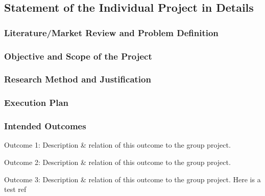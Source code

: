 \subsection{Statement of the Individual Project in Details}

\subsubsection{Literature/Market Review and Problem Definition}

\subsubsection{Objective and Scope of the Project}

\subsubsection{Research Method and Justification}

\subsubsection{Execution Plan}

\subsubsection{Intended Outcomes}
Outcome 1: Description \& relation of this outcome to the group project. 
\par
Outcome 2: Description \& relation of this outcome to the group project. 
\par
Outcome 3: Description \& relation of this outcome to the group project. Here is a test ref ~\cite{testbib}